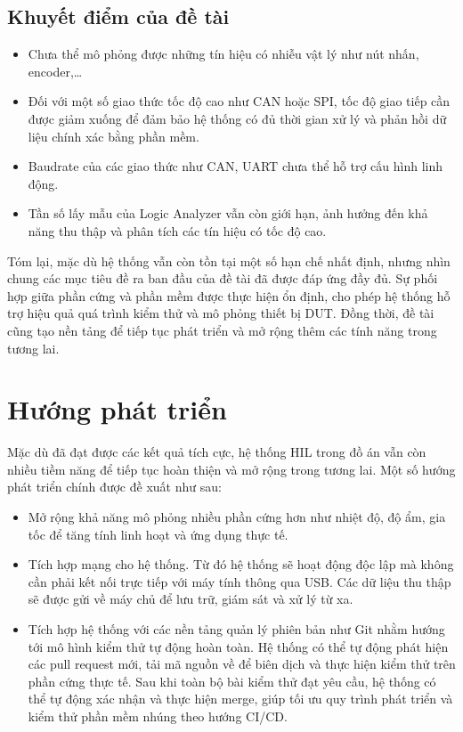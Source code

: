 \subsection{Khuyết điểm của đề tài}
\begin{itemize}
    \item Chưa thể mô phỏng được những tín hiệu có nhiễu vật lý như nút nhấn, encoder,\dots
    \item Đối với một số giao thức tốc độ cao như CAN hoặc SPI, tốc độ giao tiếp cần được giảm xuống để đảm bảo hệ thống có đủ thời gian xử lý và phản hồi dữ liệu chính xác bằng phần mềm.
    \item Baudrate của các giao thức như CAN, UART chưa thể hỗ trợ cấu hình linh động.
    \item Tần số lấy mẫu của Logic Analyzer vẫn còn giới hạn, ảnh hưởng đến khả năng thu thập và phân tích các tín hiệu có tốc độ cao.
\end{itemize}

Tóm lại, mặc dù hệ thống vẫn còn tồn tại một số hạn chế nhất định, nhưng nhìn chung các mục tiêu đề ra ban đầu của đề tài đã được đáp ứng đầy đủ.
Sự phối hợp giữa phần cứng và phần mềm được thực hiện ổn định, cho phép hệ thống hỗ trợ hiệu quả quá trình kiểm thử và mô phỏng thiết bị DUT.
Đồng thời, đề tài cũng tạo nền tảng để tiếp tục phát triển và mở rộng thêm các tính năng trong tương lai.

\section{Hướng phát triển}
Mặc dù đã đạt được các kết quả tích cực, hệ thống HIL trong đồ án vẫn còn nhiều tiềm năng để tiếp tục hoàn thiện và mở rộng trong tương lai. Một số hướng phát triển chính được đề xuất như sau:

\begin{itemize}
    \item Mở rộng khả năng mô phỏng nhiều phần cứng hơn như nhiệt độ, độ ẩm, gia tốc để tăng tính linh hoạt và ứng dụng thực tế.
    \item Tích hợp mạng cho hệ thống. Từ đó hệ thống sẽ hoạt động độc lập mà không cần phải kết nối trực tiếp với máy tính thông qua USB. Các dữ liệu thu thập sẽ được gửi về máy chủ để lưu trữ, giám sát và xử lý từ xa.
    \item Tích hợp hệ thống với các nền tảng quản lý phiên bản như Git nhằm hướng tới mô hình kiểm thử tự động hoàn toàn. Hệ thống có thể tự động phát hiện các pull request mới, tải mã nguồn về để biên dịch và thực hiện kiểm thử trên phần cứng thực tế.
    Sau khi toàn bộ bài kiểm thử đạt yêu cầu, hệ thống có thể tự động xác nhận và thực hiện merge, giúp tối ưu quy trình phát triển và kiểm thử phần mềm nhúng theo hướng CI/CD.
\end{itemize}

